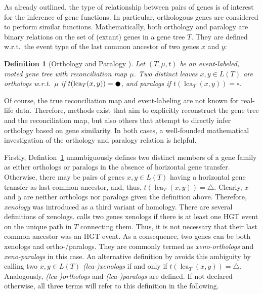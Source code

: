 \documentclass[hidelinks,11pt]{scrreprt}
\DeclareMathOperator{\lca}{lca}
\newtheorem{definition}[theorem]{Definition}
\newcommand{\SPEC}{\newmoon}
\newcommand{\HGT}{\triangle}
\newcommand{\DUPL}{\square}
\begin{document}
As already outlined, the type of relationship between pairs of genes is of interest for the inference of gene functions. In particular, orthologous genes are considered to perform similar functions. Mathematically, both orthology and paralogy are binary relations on the set of (extant) genes in a gene tree $T$. They are defined w.r.t.\ the event type of the last common ancestor of two genes $x$ and $y$:

\begin{definition}[Orthology and Paralogy {\citep{fitch2000}}]
	\label{def:orthology}
	Let $(T,\mu,t)$ be an event-labeled, rooted gene tree with reconciliation map $\mu$.
	Two distinct leaves $x,y \in L(T)$ are \emph{orthologs w.r.t.\ $\mu$} if $t(\lca_T(x,y))=\SPEC$, and \emph{paralogs} if $t(\lca_T(x,y))=\DUPL$.
\end{definition}

Of course, the true reconciliation map and event-labeling are not known for real-life data. Therefore, methods exist that aim to explicitly reconstruct the gene tree and the reconciliation map, but also others that attempt to directly infer orthology based on gene similarity. In both cases, a well-founded mathematical investigation of the orthology and paralogy relation is helpful.

Firstly, Defintion~\ref{def:orthology} unambiguously defines two distinct members of a gene family as either orthologs or paralogs in the absence of horizontal gene transfer. Otherwise, there may be pairs of genes $x,y \in L(T)$ having a horizontal gene transfer as last common ancestor, and, thus, $t(\lca_T(x,y))=\HGT$.
Clearly, $x$ and $y$ are neither orthologs nor paralogs given the definition above. Therefore, \emph{xenology} was introduced as a third variant of homology. There are several definitions of xenologs. \citet{fitch2000} calls two genes xenologs if there is at least one HGT event on the unique path in $T$ connecting them. Thus, it is not necessary that their last common ancestor was an HGT event. As a consequence, two genes can be both xenologs and ortho-/paralogs. They are commonly termed as \emph{xeno-orthologs} and \emph{xeno-paralogs} in this case.
An alternative definition by \citet{hellmuth2016} avoids this ambiguity by calling two $x,y \in L(T)$ \emph{(lca-)xenologs} if and only if $t(\lca_T(x,y))=\HGT$. Analogously, \emph{(lca-)orthologs} and \emph{(lca-)paralogs} are defined. If not declared otherwise, all three terms will refer to this definition in the following.
\end{document}
